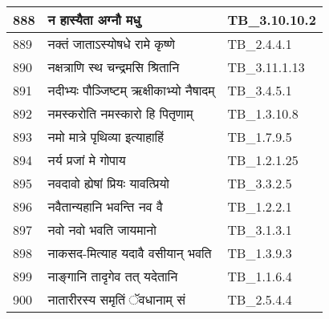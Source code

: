 \documentclass[17pt]{extarticle}
\begin{document}
\begin{longtable}{||p{0.4in}||p{4.9in}||p{0.9in}||}
    \hline
        
    888 & न हास्यैता अग्नौ मधु & TB\_3.10.10.2       \\
    
    \hline
        
    889 & नक्तं जाताऽस्योषधे रामे कृष्णे & TB\_2.4.4.1       \\
    
    \hline
        
    890 & नक्षत्राणि स्थ चन्द्रमसि श्रितानि & TB\_3.11.1.13       \\
    
    \hline
        
    891 & नदीभ्यः पौञ्जिष्टम् ऋक्षीकाभ्यो नैषादम् & TB\_3.4.5.1       \\
    
    \hline
        
    892 & नमस्करोति नमस्कारो हि पितृणाम् & TB\_1.3.10.8       \\
    
    \hline
        
    893 & नमो मात्रे पृथिव्या इत्याहाहिं & TB\_1.7.9.5       \\
    
    \hline
        
    894 & नर्य प्रजां मे गोपाय & TB\_1.2.1.25       \\
    
    \hline
        
    895 & नवदावो ह्येषां प्रियः यावत्प्रियो & TB\_3.3.2.5       \\
    
    \hline
        
    896 & नवैतान्यहानि भवन्ति नव वै & TB\_1.2.2.1       \\
    
    \hline
        
    897 & नवो नवो भवति जायमानो & TB\_3.1.3.1       \\
    
    \hline
        
    898 & नाकसद{-}मित्याह यदावै वसीयान् भवति & TB\_1.3.9.3       \\
    
    \hline
        
    899 & नाङ्गानि तादृगेव तत् यदेतानि & TB\_1.1.6.4       \\
    
    \hline
        
    900 & नातारीरस्य समृतिं ॅवधानाम् सं & TB\_2.5.4.4       \\
    

\end{longtable}
\end{document}
